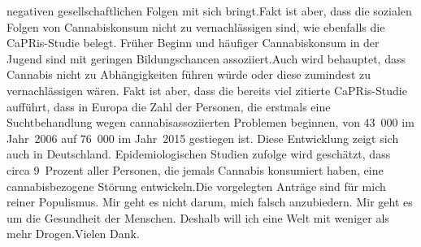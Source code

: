 \documentclass{article}
\begin{document}
negativen gesellschaftlichen Folgen mit sich bringt.Fakt ist aber, dass die sozialen Folgen von Cannabiskonsum nicht zu vernachlässigen sind, wie ebenfalls die CaPRis-Studie belegt. Früher Beginn und häufiger Cannabiskonsum in der Jugend sind mit geringen Bildungschancen assoziiert.Auch wird behauptet, dass Cannabis nicht zu Abhängigkeiten führen würde oder diese zumindest zu vernachlässigen wären. Fakt ist aber, dass die bereits viel zitierte CaPRis-Studie aufführt, dass in Europa die Zahl der Personen, die erstmals eine Suchtbehandlung wegen cannabisassoziierten Problemen beginnen, von 43 000 im Jahr 2006 auf 76 000 im Jahr 2015 gestiegen ist. Diese Entwicklung zeigt sich auch in Deutschland. Epidemiologischen Studien zufolge wird geschätzt, dass circa 9 Prozent aller Personen, die jemals Cannabis konsumiert haben, eine cannabisbezogene Störung entwickeln.Die vorgelegten Anträge sind für mich reiner Populismus. Mir geht es nicht darum, mich falsch anzubiedern. Mir geht es um die Gesundheit der Menschen. Deshalb will ich eine Welt mit weniger als mehr Drogen.Vielen Dank.
\end{document}
